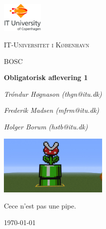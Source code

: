 
\begin{titlepage}
	\centering
	\includegraphics[width=0.15\textwidth]{logo}\par\vspace{1cm}
	{\scshape\LARGE IT-Universitet i København \par}
	\vspace{1cm}
	{\scshape\Large BOSC\par}
	\vspace{1.5cm}
	{\huge\bfseries Obligatorisk aflevering 1\par}
	\vspace{2cm}
	{\Large\itshape Tróndur Høgnason (thgn@itu.dk)\par}
	{\Large\itshape Frederik Madsen (mfrm@itu.dk)\par}
	{\Large\itshape Holger Borum (hstb@itu.dk)\par}
	\vspace{1 cm}
	\includegraphics[width=0.4\textwidth]{pipe}\par\vspace{1cm}
	Cece n'est pas une pipe.\\
\vspace{1cm}
	{\large \today\par}
\end{titlepage}